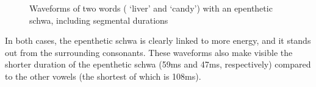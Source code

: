 \begin{figure}[ht]
\caption[Waveforms of two words with an epenthetic schwa]{Waveforms of two words ( ‘liver’ and  ‘candy’) with an epenthetic schwa, including segmental durations}\label{epentheticSchwaWaveforms}
\end{figure}

In both cases, the epenthetic schwa is clearly linked to more energy, and it stands out from the surrounding consonants. %
These waveforms also make visible the shorter duration of the epenthetic schwa (59ms and 47ms, respectively) compared to the other vowels (the shortest of which is 108ms).


